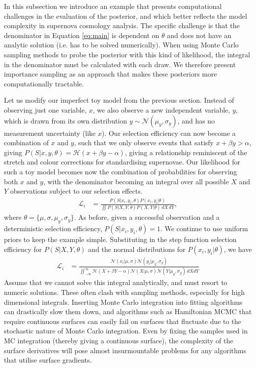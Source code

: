 \documentclass[a4paper,fleqn,usenatbib]{mnras}
\begin{document}
In this subsection we introduce an example that presents computational challenges in the evaluation of the posterior, and which better reflects the model complexity in supernova cosmology analysis. The specific challenge is that the denominator in Equation \eqref{eq:main} is dependent on $\theta$ and does not have an analytic solution (i.e. has to be solved numerically). When using Monte Carlo sampling methods to probe the posterior with this kind of likelihood, the integral in the denominator must be calculated with each draw. We therefore present importance sampling as an approach that makes these posteriors more computationally tractable.

Let us modify our imperfect toy model from the previous section. Instead of observing just one variable, $x$, we also observe a new independent variable, $y$, which is drawn from its own distribution $y \sim \mathcal{N}(\mu_y, \sigma_y)$, and has no measurement uncertainty (like $x$). Our selection efficiency can now become a combination of $x$ and $y$, such that we only observe events that satisfy $x + \beta y > \alpha$, giving $P(S|x,y,\theta) = \mathcal{H}(x + \beta y - \alpha)$, giving a relationship reminiscent of the stretch and colour corrections for standardising supernovae.  Our likelihood for such a toy model becomes now the combination of probabilities for observing both $x$ and $y$, with the denominator becoming an integral over all possible $X$ and $Y$ observations subject to our selection effects.
\begin{align}
\mathcal{L}_i &= \frac{P(S|x_i, y_i,\theta) P(x_i, y_i|\theta)}{\iint P(S | X, Y, \theta) P(X, Y|\theta)\, dX\,dY},
\end{align}
where $\theta = \lbrace \mu, \sigma, \mu_y, \sigma_y \rbrace$. As before, given a successful observation and a deterministic selection efficiency, $P(S|x_i, y_i,\theta) = 1$. We continue to use uniform priors to keep the example simple. Substituting in the step function selection efficiency for $P(S|X, Y,\theta)$ and the normal distributions for $P(x_i, y_i|\theta)$, we have
\begin{align}
\mathcal{L}_i &= \frac{ \mathcal{N}(x_i|\mu, \sigma) \mathcal{N}(y_i|\mu_y, \sigma_y)}
{\iint_{-\infty}^\infty \mathcal{H}(X + \beta Y - \alpha) \mathcal{N}(X|\mu, \sigma) \mathcal{N}(Y|\mu_y, \sigma_y)\, dX dY} \label{eq:above}
\end{align}
Assume that we cannot solve this integral analytically, and must resort to numeric solutions. These often clash with sampling methods, especially for high dimensional integrals. Inserting Monte Carlo integration into fitting algorithms can drastically slow them down, and algorithms such as Hamiltonian MCMC that require continuous surfaces can easily fail on surfaces that fluctuate due to the stochastic nature of Monte Carlo integration. Even by fixing the samples used in MC integration (thereby giving a continuous surface), the complexity of the surface derivatives will pose almost insurmountable problems for any algorithms that utilise surface gradients.
\end{document}
